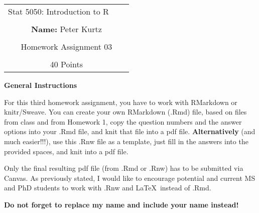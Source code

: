 \documentclass[12pt,letterpaper,final]{article}\usepackage[]{graphicx}\usepackage[]{xcolor}
\begin{document}
\begin{table}\centering
\begin{tabular*}{6.15in}{@{\extracolsep{\fill}}|llr|} \hline
Stat 5050: Introduction to R & \hspace*{0.5 in}\\
 & & \\
\multicolumn{3}{|c|}{
{\bf Name:} Peter Kurtz} \\
 & & \\
\multicolumn{3}{|c|}{
Homework Assignment 03 } \\
 & & \\
\multicolumn{3}{|c|}{
40 Points} \\
\hline
\end{tabular*}
\end{table}


{\bf General Instructions}

For this third homework assignment, you have to work with RMarkdown or knitr/Sweave.
You can create your own RMarkdown (.Rmd) file,
based on files from class and from Homework 1, copy the
question numbers and the answer options into your .Rmd file, 
and knit that file into a pdf file. 
{\bf Alternatively} (and much easier!!!), use this .Rnw file as a 
template, just fill in the answers into the provided spaces,
and knit into a pdf file.

Only the final resulting pdf file (from .Rmd or .Rnw) has to be submitted via Canvas.
As previously stated, I would like to encourage potential and current MS and PhD students
to work with .Rnw and \LaTeX\ instead of .Rmd.

{\bf Do not forget to replace my name and include your name instead!}
\end{document}
